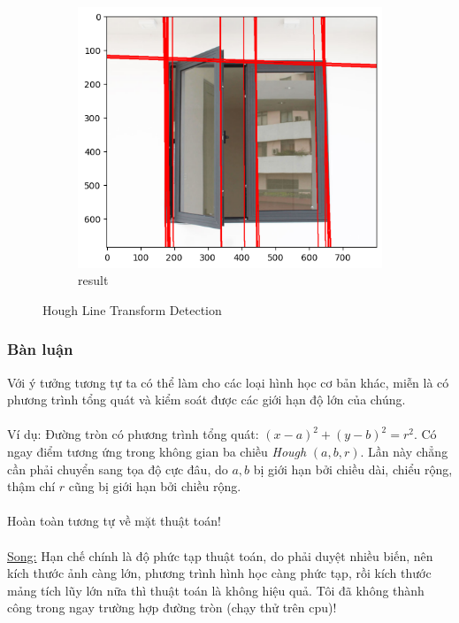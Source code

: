 \documentclass{article}
\begin{document}
\begin{figure}
        \begin{subfigure}[b]{0.7\linewidth}
            \includegraphics[width = \linewidth]{fig18c.png}
            \caption{result}
        \end{subfigure}
        
        \caption{Hough Line Transform Detection}
        \label{fig18}
    \end{figure}
    \subsubsection{Bàn luận}
    Với ý tưởng tương tự ta có thể làm cho các loại hình học cơ bản khác, miễn là có phương trình tổng quát và kiểm soát được các giới hạn độ lớn của chúng.\\\\
    Ví dụ: Đường tròn có phương trình tổng quát: $(x-a)^2+(y-b)^2 = r^2$. Có ngay điểm tương ứng trong không gian ba chiều \textit{Hough} $(a,b,r)$. Lần này chẳng cần phải chuyển sang tọa độ cực đâu, do $a,b$ bị giới hạn bởi chiều dài, chiểu rộng, thậm chí $r$ cũng bị giới hạn bởi chiều rộng.\\\\
    Hoàn toàn tương tự về mặt thuật toán!\\\\
    \underline{Song:} Hạn chế chính là độ phức tạp thuật toán, do phải duyệt nhiều biến, nên kích thước ảnh càng lớn, phương trình hình học càng phức tạp, rồi kích thước mảng tích lũy lớn nữa thì thuật toán là không hiệu quả. Tôi đã không thành công trong ngay trường hợp đường tròn (chạy thử trên cpu)!
\end{document}
